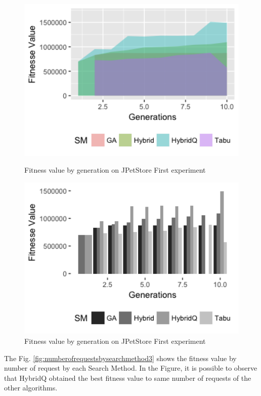 \begin{figure}[h]
\begin{minipage}{.5\textwidth}
\centering
\includegraphics[width=1\textwidth]{./images/experiment3-1.png}
\caption{Fitness value by generation on JPetStore First experiment}
\label{fig:experiment31}
\end{minipage}
\begin{minipage}{.5\textwidth}
\centering
\includegraphics[width=1\textwidth]{./images/experiment3-2.png}
\caption{Fitness value by generation on JPetStore First experiment}
\label{fig:experiment32}
\end{minipage}
\end{figure}

The Fig. \ref{fig:numberofrequestsbysearchmethod3} shows the fitness value by number of request by each Search Method. In the Figure, it is possible to observe that HybridQ obtained the best fitness value to same number of requests of the other algorithms.

